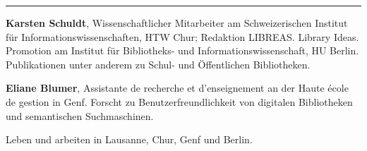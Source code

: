 \begin{center}\rule{3in}{0.4pt}\end{center}

\textbf{Karsten Schuldt}, Wissenschaftlicher Mitarbeiter am
Schweizerischen Institut für Informationswissenschaften, HTW Chur;
Redaktion LIBREAS. Library Ideas. Promotion am Institut für Bibliotheks-
und Informationswissenschaft, HU Berlin. Publikationen unter anderem zu
Schul- und Öffentlichen Bibliotheken.

\textbf{Eliane Blumer}, Assistante de recherche et d'enseignement an der
Haute école de gestion in Genf. Forscht zu Benutzerfreundlichkeit von
digitalen Bibliotheken und semantischen Suchmaschinen.

Leben und arbeiten in Lausanne, Chur, Genf und Berlin.
